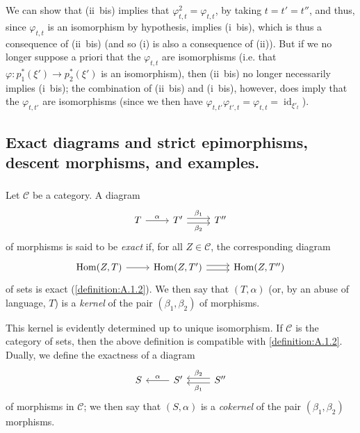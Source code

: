 \documentclass{article}
\theoremstyle{plain}
\theoremstyle{definition}
\newenvironment{definition}[1]
  {\renewcommand\theinnercustomdefinition{#1}\innercustomdefinition}
  {\endinnercustomdefinition}
\newcommand{\cat}[1]{{\mathcal{#1}}}
\DeclareMathOperator{\id}{id}
\DeclareMathOperator{\Hom}{Hom}
\begin{document}
We can show that (ii~bis) implies that $\varphi_{t,t}^2=\varphi_{t,t}$, by taking $t=t'=t''$, and thus, since $\varphi_{t,t}$ is an isomorphism by hypothesis, implies (i~bis), which is thus a consequence of (ii~bis) (and so (i) is also a consequence of (ii)).
But if we no longer suppose a priori that the $\varphi_{t,t}$ are isomorphisms (i.e. that $\varphi\colon p_1^*(\xi')\to p_2^*(\xi')$ is an isomorphism), then (ii~bis) no longer necessarily implies (i~bis);
the combination of (ii~bis) and (i~bis), however, does imply that the $\varphi_{t,t'}$ are isomorphisms (since we then have $\varphi_{t,t'}\varphi_{t',t}=\varphi_{t,t}=\id_{\xi'_t}$).


\subsection{Exact diagrams and strict epimorphisms, descent morphisms, and examples.}
\label{A.2}

\subsubsection{}
\label{A.2.a}

\begin{definition}{2.1}
\label{definition:A.2.1}
  Let $\cat{C}$ be a category.
  A diagram
  \[
    \begin{tikzcd}
      T \rar["\alpha"]
      & T' \rar[shift left=1,"\beta_1"] \rar[shift right=1,swap,"\beta_2"]
      & T''
    \end{tikzcd}
  \]
  of morphisms is said to be \emph{exact} if, for all $Z\in\cat{C}$, the corresponding diagram
  \[
    \begin{tikzcd}
      \Hom(Z,T) \rar
      & \Hom(Z,T') \rar[shift left=1] \rar[shift right=1]
      & \Hom(Z,T'')
    \end{tikzcd}
  \]
  of sets is exact (\cref{definition:A.1.2}).
  We then say that $(T,\alpha)$ (or, by an abuse of language, $T$) is a \emph{kernel} of the pair $(\beta_1,\beta_2)$ of morphisms.
\end{definition}

This kernel is evidently determined up to unique isomorphism.
If $\cat{C}$ is the category of sets, then the above definition is compatible with \cref{definition:A.1.2}.
Dually, we define the exactness of a diagram
\[
  \begin{tikzcd}
    S
    & S' \lar[swap,"\alpha"]
    & S''\lar[shift left=1,"\beta_1"] \lar[shift right=1,swap,"\beta_2"]
  \end{tikzcd}
\]
of morphisms in $\cat{C}$;
we then say that $(S,\alpha)$ is a \emph{cokernel} of the pair $(\beta_1,\beta_2)$ morphisms.
\end{document}
